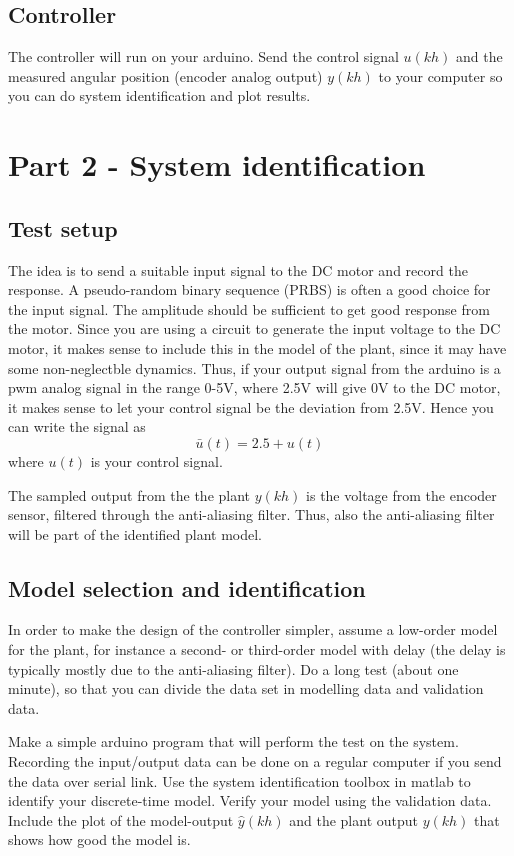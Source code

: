 \documentclass[a4paper]{scrartcl}
\begin{document}
\subsection*{Controller}
\label{sec-3-4}
The controller will run on your arduino. Send the control signal \(u(kh)\) and the measured angular position (encoder analog output) \(y(kh)\) to your computer so you can do system identification and plot results. 

\section*{Part 2 - System identification}
\label{sec-4}

\subsection*{Test setup}
\label{sec-4-1}
The idea is to send a suitable input signal to the DC motor and record the response. A pseudo-random binary sequence (PRBS) is often a good choice for the input signal. The amplitude should be sufficient to get good response from the motor. Since you are using a circuit to generate the input voltage to the DC motor, it makes sense to include this in the model of the plant, since it may have some non-neglectble dynamics. Thus, if your output signal from the arduino is a pwm analog signal in the range 0-5V, where 2.5V will give 0V to the DC motor, it makes sense to let your control signal be the deviation from 2.5V. Hence you can write the signal as 
\[ \bar{u}(t) = 2.5 + u(t) \]
where \(u(t)\) is your control signal.

The sampled output from the the plant \(y(kh)\) is the voltage from the encoder sensor, filtered through the anti-aliasing filter. Thus, also the anti-aliasing filter will be part of the identified plant model. 

\subsection*{Model selection and identification}
\label{sec-4-2}
In order to make the design of the controller simpler, assume a low-order model for the plant, for instance a second- or third-order model with delay (the delay is typically mostly due to the anti-aliasing filter). Do a long test (about one minute), so that you can divide the data set in modelling data and validation data. 

Make a simple arduino program that will perform the test on the system. Recording the input/output data can be done on a regular computer if you send the data over serial link. Use the system identification toolbox in matlab to identify your discrete-time model. Verify your model using the validation data. Include the plot of the model-output \(\hat{y}(kh)\) and the plant output \(y(kh)\) that shows how good the model is.  
\end{document}
